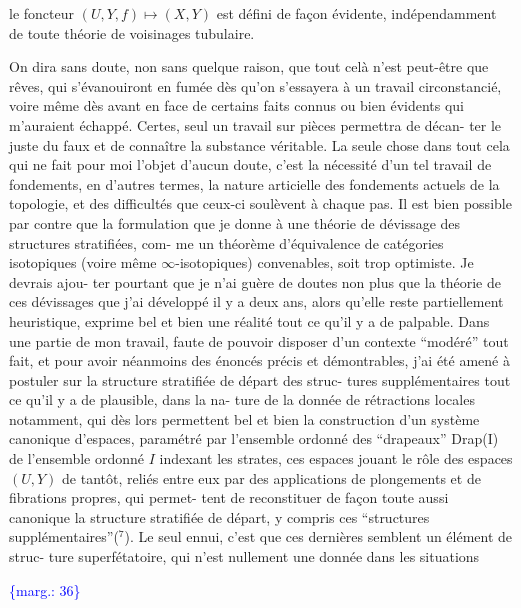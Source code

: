 \documentclass[11pt]{article}
\newcommand{\scanpage}[1]{\par\bigskip\noindent{\small\sffamily[scan #1]}\par}
\newcommand{\mspage}[1]{{\small\sffamily[p.\,#1]}}
\newcommand{\margin}[1]{\textcolor{blue}{\{\textsf{marg.:} #1\}}}
\begin{document}
le foncteur  $(U,Y,f) \longmapsto (X,Y)$   est défini de façon évidente,
indépendamment de toute théorie de voisinages tubulaire.

On dira sans doute, non sans quelque raison, que tout
celà n'est peut-être que rêves, qui s'évanouiront en fumée dès
qu'on s'essayera à un travail circonstancié, voire même dès avant
en face de certains faits connus ou bien évidents qui m'auraient
échappé. Certes, seul un travail sur pièces permettra de décan-%
ter le juste du faux et de connaître la substance véritable. La
seule chose dans tout cela qui ne fait pour moi l'objet d'aucun
doute, c'est la nécessité d'un tel travail de fondements, en
d'autres termes, la nature articielle des fondements actuels de
la topologie, et des difficultés que ceux-ci soulèvent à chaque
pas. Il est bien possible par contre que la formulation que je
donne à une théorie de dévissage des structures stratifiées, com-%
me un théorème d'équivalence de catégories isotopiques (voire même
$\infty$-isotopiques) convenables, soit trop optimiste. Je devrais ajou-%
ter pourtant que je n'ai guère de doutes non plus que la théorie
de ces dévissages que j'ai développé il y a deux ans, alors qu'elle
reste partiellement heuristique, exprime bel et bien une réalité
tout ce qu'il y a de palpable. Dans une partie de mon travail,
faute de pouvoir disposer d'un contexte ``modéré'' tout fait, et
pour avoir néanmoins des énoncés précis et démontrables, j'ai été
amené à postuler sur la structure stratifiée de départ des struc-%
tures supplémentaires tout ce qu'il y a de plausible, dans la na-%
ture de la donnée de rétractions locales notamment, qui dès lors
permettent bel et bien la construction d'un système canonique
d'espaces, paramétré par l'ensemble ordonné des ``drapeaux'' Drap(I)
de l'ensemble ordonné  $I$  indexant les strates, ces espaces jouant
le rôle des espaces  $(U,Y)$  de tantôt, reliés entre eux par des
applications de plongements et de fibrations propres, qui permet-%
tent de reconstituer de façon toute aussi canonique la structure
stratifiée de départ, y compris ces ``structures supplémentaires''(${}^{7}$).
Le seul ennui, c'est que ces dernières semblent un élément de struc-%
ture superfétatoire, qui n'est nullement une donnée dans les situations

\margin{36}

\clearpage
\scanpage{119/37}
\mspage{35}
\end{document}
